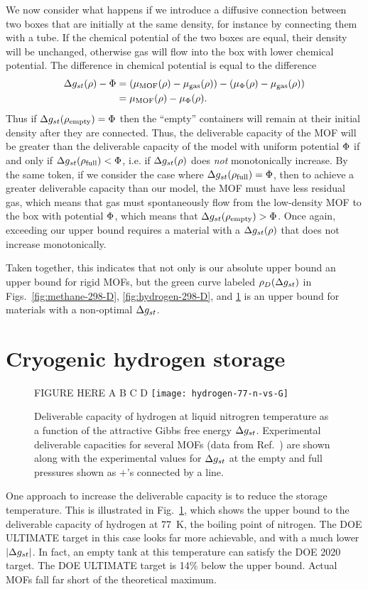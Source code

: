 We now consider what happens if we introduce a diffusive connection between two
boxes that are initially at the same density, for instance by connecting them
with a tube. If the chemical potential of the two boxes are equal, their
density will be unchanged, otherwise gas will flow into the box with lower
chemical potential. The difference in chemical potential is equal to the
difference
\begin{align}
   \Delta g_{st}(\rho) - \Phi &= \left(\mu_{\text{MOF}}(\rho) - \mu_{\text{gas}}(\rho)\right)
   - \left(\mu_{\Phi}(\rho) - \mu_{\text{gas}}(\rho)\right)
   \\
   &= \mu_{\text{MOF}}(\rho) - \mu_{\Phi}(\rho).
\end{align}
Thus if $\Delta g_{st}(\rho_{\text{empty}}) = \Phi$ then the ``empty'' containers will remain at
their initial density after they are connected. Thus, the deliverable capacity
of the MOF will be greater than the deliverable capacity of the model with
uniform potential $\Phi$ if and only if $\Delta g_{st}(\rho_{\text{full}})<\Phi$, i.e. if $\Delta g_{st}(\rho)$
does \emph{not} monotonically increase. By the same token, if we consider the
case where $\Delta g_{st}(\rho_{\text{full}}) = \Phi$, then to achieve a greater deliverable
capacity than our model, the MOF must have less residual gas, which means that
gas must spontaneously flow from the low-density MOF to the box with potential
$\Phi$, which means that $\Delta g_{st}(\rho_{\text{empty}})>\Phi$. Once again, exceeding our upper
bound requires a material with a $\Delta g_{st}(\rho)$ that does not increase
monotonically.

Taken together, this indicates that not only is our absolute upper bound an
upper bound for rigid MOFs, but the green curve labeled $\rho_D(\Delta g_{st})$ in
Figs.~\ref{fig:methane-298-D}, \ref{fig:hydrogen-298-D}, and
\ref{fig:hydrogen-77-D} is an upper bound for materials with a non-optimal
$\Delta g_{st}$.

\section{Cryogenic hydrogen storage}\label{sec:cryo-hydrogen}
\begin{figure}
    \centering
    FIGURE HERE A B C D
    \texttt{[image: hydrogen-77-n-vs-G]}
    \caption{Deliverable capacity of hydrogen at liquid nitrogren temperature as a function of the attractive Gibbs free energy $\Delta g_{st}$. Experimental deliverable capacities for several MOFs (data from Ref.~\cite{garcia2018benchmark}) are shown along with the experimental values for $\Delta g_{st}$ at the empty and full pressures shown as $+$'s connected by a line.}
    \label{fig:hydrogen-77-D}
\end{figure}

One approach to increase the deliverable capacity is to reduce the storage
temperature. This is illustrated in Fig.~\ref{fig:hydrogen-77-D}, which shows
the upper bound to the deliverable capacity of hydrogen at 77\ K, the boiling
point of nitrogen. The DOE ULTIMATE target in this case looks far more
achievable, and with a much lower $|\Delta g_{st}|$. In fact, an empty tank at this
temperature can satisfy the DOE 2020 target. The DOE ULTIMATE target is 14\%
below the upper bound. Actual MOFs fall far short of the theoretical maximum.
